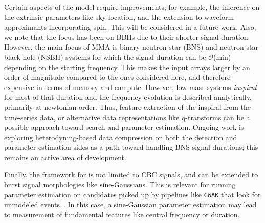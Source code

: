 \begin{refsection}
Certain aspects of the model require improvements; for example, the inference on the extrinsic parameters like sky location, and the extension to waveform approximants incorporating spin. 
This will be considered in a future work.
Also, we note that the focus has been on BBHs due to their shorter signal duration. 
However, the main focus of MMA is binary neutron star (BNS) and neutron star black hole (NSBH) systems for which the signal duration can be $\mathcal{O}$(min) depending on the starting frequency. 
This makes the input arrays larger by an order of magnitude compared to the ones considered here, and therefore expensive in terms of memory and compute.
However, low mass systems \emph{inspiral} for most of that duration and the frequency evolution is described analytically, primarily at newtonian order. 
Thus, feature extraction of the inspiral from the time-series data, or alternative data representations like q-transforms can be a possible approach toward search and parameter estimation.
Ongoing work is exploring heterodyning-based data compression on both the detection and parameter estimation sides as a path toward handling BNS signal durations; this remains an active area of development.

Finally, the framework for {\amplfi} is not limited to CBC signals, and can be extended to burst signal morphologies like sine-Gaussians. 
This is relevant for running parameter estimation on candidates picked up by pipelines like
{\tt GWAK} that look for unmodeled events~\cite{Raikman:2023ktu}. 
In this case, a sine-Gaussian parameter estimation may lead to measurement of fundamental features like central frequency or duration.


\singlespacing
\printbibliography[title=References,heading=subbibintoc]
\end{refsection}